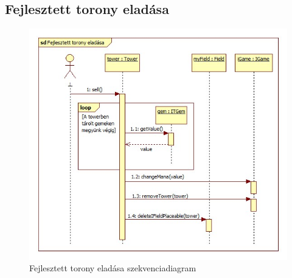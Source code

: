 \subsection{Fejlesztett torony eladása}
\begin{figure}[H]
\begin{center}
\includegraphics[width=17cm]{chapters/chapter05/images/sd_Fejlesztett_torony_eladasa.jpg}
\caption{Fejlesztett torony eladása szekvenciadiagram}
\label{fig:sd_Fejlesztett_torony_eladasa}
\end{center}
\end{figure}

